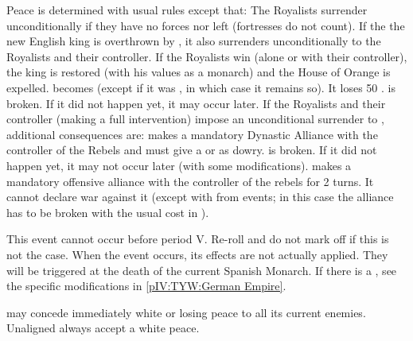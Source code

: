 \phpaix
\aparag Peace is determined with usual rules except that:
\bparag The Royalists surrender unconditionally if they have no forces nor
\REVOLT left (fortresses do not count).
\aparag If the the new English king is overthrown by \REVOLT , it also
surrenders unconditionally to the Royalists and their controller.
 If the Royalists win (alone or with their
controller), the king is restored (with his values as a monarch) and the House
of Orange is expelled.
\bparag \ENG becomes \CATHCR (except if it was \CATHCO, in which case it
remains so). It loses 50 \PV.
\bparag {} is broken. If it did not happen yet, it may
occur later.
 If the Royalists and their controller
(making a full intervention) impose an unconditional surrender to \ENG,
additional consequences are:
\bparag \ENG makes a mandatory Dynastic Alliance with the controller of the
Rebels and must give a \COL or \TP as dowry.
\bparag {} is broken. If it did not happen yet, it may
not occur later (with some modifications).%
%
\bparag \ENG makes a mandatory offensive alliance with the controller of the
rebels for 2 turns. It cannot declare war against it (except with \CB from
events; in this case the alliance has to be broken with the usual cost in
\STAB).





\activation{}
\aparag This event cannot occur before period V. Re-roll and do not mark off
if this is not the case.
\aparag When the event occurs, its effects are not actually applied. They will
be triggered at the death of the current Spanish Monarch.
\aparag If there is a \GE, see the specific modifications in
\ref{pIV:TYW:German Empire}.


\phevnt
\aparag \SPA may concede immediately white or losing peace to all its current
enemies. Unaligned \MIN always accept a white peace.

